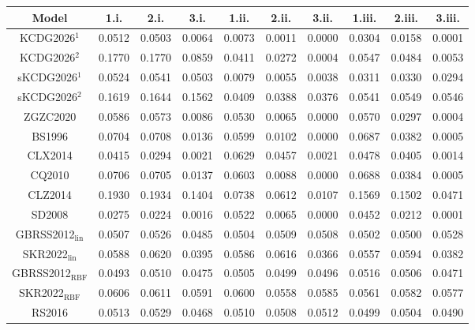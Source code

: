 
\begin{tabular}{cccccccccc}
\hline
Model & 1.i. & 2.i. & 3.i. & 1.ii. & 2.ii. & 3.ii. & 1.iii. & 2.iii. & 3.iii.\\
\hline
KCDG2026$^1$ & 0.0512 & 0.0503 & 0.0064 & 0.0073 & 0.0011 & 0.0000 & 0.0304 & 0.0158 & 0.0001\\
KCDG2026$^2$ & 0.1770 & 0.1770 & 0.0859 & 0.0411 & 0.0272 & 0.0004 & 0.0547 & 0.0484 & 0.0053\\
sKCDG2026$^1$ & 0.0524 & 0.0541 & 0.0503 & 0.0079 & 0.0055 & 0.0038 & 0.0311 & 0.0330 & 0.0294\\
sKCDG2026$^2$ & 0.1619 & 0.1644 & 0.1562 & 0.0409 & 0.0388 & 0.0376 & 0.0541 & 0.0549 & 0.0546\\
ZGZC2020 & 0.0586 & 0.0573 & 0.0086 & 0.0530 & 0.0065 & 0.0000 & 0.0570 & 0.0297 & 0.0004\\

BS1996 & 0.0704 & 0.0708 & 0.0136 & 0.0599 & 0.0102 & 0.0000 & 0.0687 & 0.0382 & 0.0005\\
CLX2014 & 0.0415 & 0.0294 & 0.0021 & 0.0629 & 0.0457 & 0.0021 & 0.0478 & 0.0405 & 0.0014\\
CQ2010 & 0.0706 & 0.0705 & 0.0137 & 0.0603 & 0.0088 & 0.0000 & 0.0688 & 0.0384 & 0.0005\\
CLZ2014 & 0.1930 & 0.1934 & 0.1404 & 0.0738 & 0.0612 & 0.0107 & 0.1569 & 0.1502 & 0.0471\\
SD2008 & 0.0275 & 0.0224 & 0.0016 & 0.0522 & 0.0065 & 0.0000 & 0.0452 & 0.0212 & 0.0001\\

GBRSS2012$_{\text{lin}}$ & 0.0507 & 0.0526 & 0.0485 & 0.0504 & 0.0509 & 0.0508 & 0.0502 & 0.0500 & 0.0528\\
SKR2022$_{\text{lin}}$ & 0.0588 & 0.0620 & 0.0395 & 0.0586 & 0.0616 & 0.0366 & 0.0557 & 0.0594 & 0.0382\\
GBRSS2012$_{\text{RBF}}$ & 0.0493 & 0.0510 & 0.0475 & 0.0505 & 0.0499 & 0.0496 & 0.0516 & 0.0506 & 0.0471\\
SKR2022$_{\text{RBF}}$ & 0.0606 & 0.0611 & 0.0591 & 0.0600 & 0.0558 & 0.0585 & 0.0561 & 0.0582 & 0.0577\\
RS2016 & 0.0513 & 0.0529 & 0.0468 & 0.0510 & 0.0508 & 0.0512 & 0.0499 & 0.0504 & 0.0490\\
\hline
\end{tabular}
